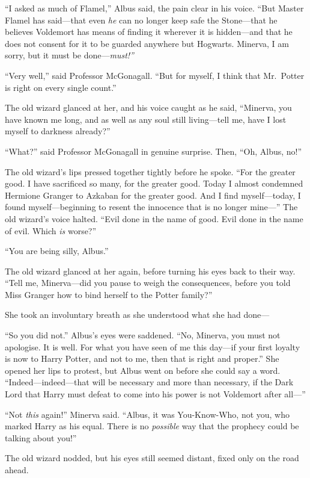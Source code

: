 ``I asked as much of Flamel,'' Albus said, the pain clear in his voice.
``But Master Flamel has said---that even \emph{he} can no longer keep
safe the Stone---that he believes Voldemort has means of finding it
wherever it is hidden---and that he does not consent for it to be
guarded anywhere but Hogwarts. Minerva, I am sorry, but it must be
done---\emph{must!''}

``Very well,'' said Professor McGonagall. ``But for myself, I think that
Mr.~Potter is right on every single count.''

The old wizard glanced at her, and his voice caught as he said,
``Minerva, you have known me long, and as well as any soul still
living---tell me, have I lost myself to darkness already?''

``What?'' said Professor McGonagall in genuine surprise. Then, ``Oh,
Albus, no!''

The old wizard's lips pressed together tightly before he spoke. ``For
the greater good. I have sacrificed so many, for the greater good. Today
I almost condemned Hermione Granger to Azkaban for the greater good. And
I find myself---today, I found myself---beginning to resent the
innocence that is no longer mine---'' The old wizard's voice halted.
``Evil done in the name of good. Evil done in the name of evil. Which
\emph{is} worse?''

``You are being silly, Albus.''

The old wizard glanced at her again, before turning his eyes back to
their way. ``Tell me, Minerva---did you pause to weigh the consequences,
before you told Miss Granger how to bind herself to the Potter family?''

She took an involuntary breath as she understood what she had done---

``So you did not.'' Albus's eyes were saddened. ``No, Minerva, you must
not apologise. It is well. For what you have seen of me this day---if
your first loyalty is now to Harry Potter, and not to me, then that is
right and proper.'' She opened her lips to protest, but Albus went on
before she could say a word. ``Indeed---indeed---that will be necessary
and more than necessary, if the Dark Lord that Harry must defeat to come
into his power is not Voldemort after all---''

``Not \emph{this} again!'' Minerva said. ``Albus, it was You-Know-Who,
not you, who marked Harry as his equal. There is no \emph{possible} way
that the prophecy could be talking about you!''

The old wizard nodded, but his eyes still seemed distant, fixed only on
the road ahead.

